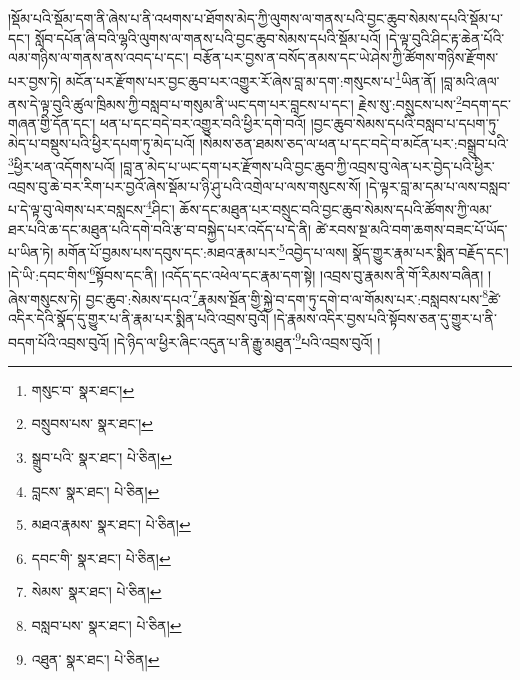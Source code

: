 །སྡོམ་པའི་སྡོམ་དག་ནི་ཞེས་པ་ནི་འཕགས་པ་ཐོགས་མེད་ཀྱི་ལུགས་ལ་གནས་པའི་བྱང་ཆུབ་སེམས་དཔའི་སྡོམ་པ་དང་། སློབ་དཔོན་ཞི་བའི་ལྷའི་ལུགས་ལ་གནས་པའི་བྱང་ཆུབ་སེམས་དཔའི་སྡོམ་པའོ། །དེ་ལྟ་བུའི་ཤིང་རྟ་ཆེན་པོའི་ལམ་གཉིས་ལ་གནས་ནས་འབད་པ་དང་། བརྩོན་པར་བྱས་ན་བསོད་ནམས་དང་ཡེ་ཤེས་ཀྱི་ཚོགས་གཉིས་རྫོགས་པར་བྱས་ཏེ། མངོན་པར་རྫོགས་པར་བྱང་ཆུབ་པར་འགྱུར་རོ་ཞེས་བླ་མ་དག་:གསུངས་པ་\footnote{གསུང་བ་  སྣར་ཐང་། }ཡིན་ནོ། །བླ་མའི་ཞལ་ནས་དེ་ལྟ་བུའི་ཚུལ་ཁྲིམས་ཀྱི་བསླབ་པ་གསུམ་ནི་ཡང་དག་པར་བླངས་པ་དང་། རྗེས་སུ་:བསྲུངས་པས་\footnote{བསྲུབས་པས་  སྣར་ཐང་། }བདག་དང་གཞན་གྱི་དོན་དང་། ཕན་པ་དང་བདེ་བར་འགྱུར་བའི་ཕྱིར་དགེ་བའོ། །བྱང་ཆུབ་སེམས་དཔའི་བསླབ་པ་དཔག་ཏུ་མེད་པ་བསྡུས་པའི་ཕྱིར་དཔག་ཏུ་མེད་པའོ། །སེམས་ཅན་ཐམས་ཅད་ལ་ཕན་པ་དང་བདེ་བ་མངོན་པར་:བསྒྲུབ་པའི་\footnote{སྒྲུབ་པའི་  སྣར་ཐང་།  པེ་ཅིན། }ཕྱིར་ཕན་འདོགས་པའོ། །བླ་ན་མེད་པ་ཡང་དག་པར་རྫོགས་པའི་བྱང་ཆུབ་ཀྱི་འབྲས་བུ་ལེན་པར་བྱེད་པའི་ཕྱིར་འབྲས་བུ་ཆེ་བར་རིག་པར་བྱའོ་ཞེས་སྡོམ་པ་ཉི་ཤུ་པའི་འགྲེལ་པ་ལས་གསུངས་སོ། །དེ་ལྟར་བླ་མ་དམ་པ་ལས་བསླབ་པ་དེ་ལྟ་བུ་ལེགས་པར་བསླངས་\footnote{བླངས་  སྣར་ཐང་།  པེ་ཅིན། }ཤིང་། ཆོས་དང་མཐུན་པར་བསྲུང་བའི་བྱང་ཆུབ་སེམས་དཔའི་ཚོགས་ཀྱི་ལམ་ཐར་པའི་ཆ་དང་མཐུན་པའི་དགེ་བའི་རྩ་བ་བསྐྱེད་པར་འདོད་པ་དེ་ནི། ཚེ་རབས་སྔ་མའི་བག་ཆགས་བཟང་པོ་ཡོད་པ་ཡིན་ཏེ། མགོན་པོ་བྱམས་པས་དབུས་དང་:མཐའ་རྣམ་པར་\footnote{མཐའ་རྣམས་  སྣར་ཐང་།  པེ་ཅིན། }འབྱེད་པ་ལས། སྣོད་གྱུར་རྣམ་པར་སྨིན་བརྗོད་དང་། །དེ་ཡི་:དབང་གིས་\footnote{དབང་གི་  སྣར་ཐང་།  པེ་ཅིན། }སྟོབས་དང་ནི། །འདོད་དང་འཕེལ་དང་རྣམ་དག་སྟེ། །འབྲས་བུ་རྣམས་ནི་གོ་རིམས་བཞིན། །ཞེས་གསུངས་ཏེ། བྱང་ཆུབ་:སེམས་དཔའ་\footnote{སེམས་  སྣར་ཐང་།  པེ་ཅིན། }རྣམས་སྔོན་གྱི་སྐྱེ་བ་དག་ཏུ་དགེ་བ་ལ་གོམས་པར་:བསླབས་པས་\footnote{བསླབ་པས་  སྣར་ཐང་།  པེ་ཅིན། }ཚེ་འདིར་དེའི་སྣོད་དུ་གྱུར་པ་ནི་རྣམ་པར་སྨིན་པའི་འབྲས་བུའོ། །དེ་རྣམས་འདིར་བྱས་པའི་སྟོབས་ཅན་དུ་གྱུར་པ་ནི་བདག་པོའི་འབྲས་བུའོ། །དེ་ཉིད་ལ་ཕྱིར་ཞིང་འདུན་པ་ནི་རྒྱུ་མཐུན་\footnote{འཐུན་  སྣར་ཐང་།  པེ་ཅིན། }པའི་འབྲས་བུའོ། །
